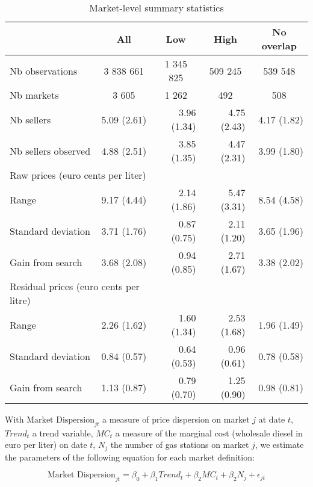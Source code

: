\documentclass[english]{article}
\begin{document}
\begin{table}[H]
  \caption{Market-level summary statistics}
    \begin{tabular}{lrrrr}
    \toprule
    \toprule
          & \multicolumn{1}{c}{All} & \multicolumn{1}{c}{Low} & \multicolumn{1}{c}{High} & \multicolumn{1}{c}{No overlap} \\
    \midrule
    Nb observations & \multicolumn{1}{c}{3 838 661} & \multicolumn{1}{c}{1 345 825} & \multicolumn{1}{c}{ 509 245} & \multicolumn{1}{c}{ 539 548} \\
    Nb markets & \multicolumn{1}{c}{ 3 605} & \multicolumn{1}{c}{ 1 262} & \multicolumn{1}{c}{  492} & \multicolumn{1}{c}{  508} \\
    \midrule
    Nb sellers & 5.09 (2.61) & 3.96 (1.34) & 4.75 (2.43) & 4.17 (1.82) \\
    Nb sellers observed & 4.88 (2.51) & 3.85 (1.35) & 4.47 (2.31) & 3.99 (1.80) \\
    \midrule
    \multicolumn{2}{l}{Raw prices (euro cents per liter)} &       &       &  \\
    Range & 9.17 (4.44) & 2.14 (1.86) & 5.47 (3.31) & 8.54 (4.58) \\
    Standard deviation & 3.71 (1.76) & 0.87 (0.75) & 2.11 (1.20) & 3.65 (1.96) \\
    Gain from search & 3.68 (2.08) & 0.94 (0.85) & 2.71 (1.67) & 3.38 (2.02) \\
    \midrule
    \multicolumn{2}{l}{Residual prices (euro cents per litre)} &       &       &  \\
    Range & 2.26 (1.62) & 1.60 (1.34) & 2.53 (1.68) & 1.96 (1.49) \\
    Standard deviation & 0.84 (0.57) & 0.64 (0.53) & 0.96 (0.61) & 0.78 (0.58) \\
    Gain from search & 1.13 (0.87) & 0.79 (0.70) & 1.25 (0.90) & 0.98 (0.81) \\
\bottomrule
\bottomrule
\end{tabular}
\label{tab:stats_des_markets}
\end{table}

With $\text{Market Dispersion}_{jt}$ a measure of price dispersion on market $j$ at date $t$, $Trend_t$ a trend variable, $MC_t$ a measure of the marginal cost (wholesale diesel in euro per liter) on date $t$, $N_j$ the number of gas stations on market $j$, we estimate the parameters of the following equation for each market definition:

\begin{equation}
\text{Market Dispersion}_{jt}= \beta_0 + \beta_1 Trend_t + \beta_2 MC_t + \beta_2 N_j + \epsilon_{jt}
\end{equation}
\end{document}

